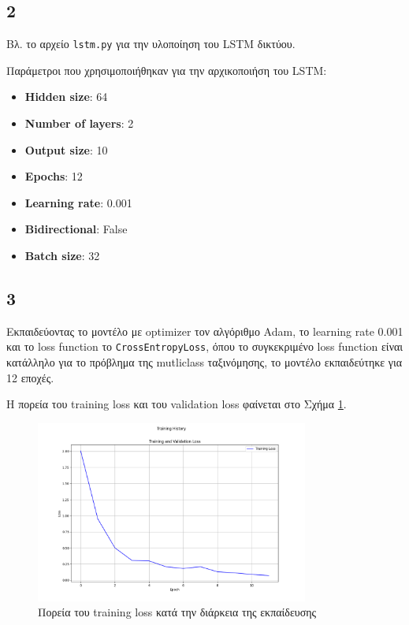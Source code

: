 \documentclass[a4paper,12pt]{article}
\begin{document}
\subsection*{2}

Βλ. το αρχείο \texttt{lstm.py} για την υλοποίηση του LSTM δικτύου.


Παράμετροι που χρησιμοποιήθηκαν για την αρχικοποιήση του LSTM:

\begin{itemize}
    \item \textbf{Hidden size}: 64
    \item \textbf{Number of layers}: 2
    \item \textbf{Output size}: 10
    \item \textbf{Epochs}: 12
    \item \textbf{Learning rate}: 0.001
    \item \textbf{Bidirectional}: False
    \item \textbf{Batch size}: 32
\end{itemize}

\subsection*{3}

Εκπαιδεύοντας το μοντέλο με optimizer τον αλγόριθμο Adam, το learning rate 0.001 και το loss function το \texttt{CrossEntropyLoss},
όπου το συγκεκριμένο loss function είναι κατάλληλο για το πρόβλημα της mutliclass ταξινόμησης,  το μοντέλο εκπαιδεύτηκε για 12 εποχές.

Η πορεία του training loss και του validation loss φαίνεται στο Σχήμα \ref{fig:loss_plot_lstm}.

\begin{figure}[h]
    \centering
    \includegraphics[width=0.8\textwidth]{tr_loss_lstm.png}
    \caption{Πορεία του training loss κατά την διάρκεια της εκπαίδευσης}
    \label{fig:loss_plot_lstm}
\end{figure}
\end{document}

